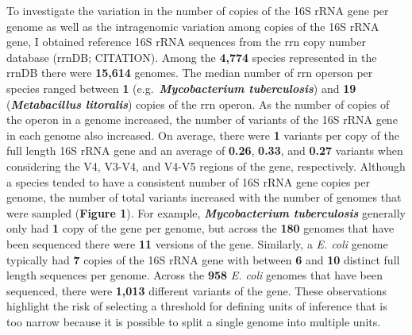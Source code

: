 \documentclass[
]{article}
\begin{document}
To investigate the variation in the number of copies of the 16S rRNA
gene per genome as well as the intragenomic variation among copies of
the 16S rRNA gene, I obtained reference 16S rRNA sequences from the rrn
copy number database (rrnDB; CITATION). Among the \textbf{4,774} species
represented in the rrnDB there were \textbf{15,614} genomes. The median
number of rrn operson per species ranged between \textbf{1}
(e.g.~\textbf{\emph{Mycobacterium tuberculosis}}) and \textbf{19}
(\textbf{\emph{Metabacillus litoralis}}) copies of the rrn operon. As
the number of copies of the operon in a genome increased, the number of
variants of the 16S rRNA gene in each genome also increased. On average,
there were \textbf{1} variants per copy of the full length 16S rRNA gene
and an average of \textbf{0.26}, \textbf{0.33}, and \textbf{0.27}
variants when considering the V4, V3-V4, and V4-V5 regions of the gene,
respectively. Although a species tended to have a consistent number of
16S rRNA gene copies per genome, the number of total variants increased
with the number of genomes that were sampled (\textbf{Figure 1}). For
example, \textbf{\emph{Mycobacterium tuberculosis}} generally only had
\textbf{1} copy of the gene per genome, but across the \textbf{180}
genomes that have been sequenced there were \textbf{11} versions of the
gene. Similarly, a \emph{E. coli} genome typically had \textbf{7} copies
of the 16S rRNA gene with between \textbf{6} and \textbf{10} distinct
full length sequences per genome. Across the \textbf{958} \emph{E. coli}
genomes that have been sequenced, there were \textbf{1,013} different
variants of the gene. These observations highlight the risk of selecting
a threshold for defining units of inference that is too narrow because
it is possible to split a single genome into multiple units.
\end{document}
